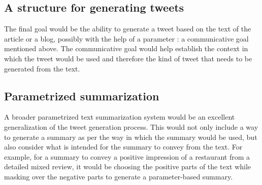 \subsection{A structure for generating tweets}
The final goal would be the ability to generate a tweet based on the text of the article or a blog, possibly with the help of a parameter : a communicative goal mentioned above. The communicative goal would help establish the context in which the tweet would be used and therefore the kind of tweet that needs to be generated from the text.  

\subsection{Parametrized summarization}
A broader parametrized text summarization system would be an excellent generalization of the tweet generation process. This would not only include a way to generate a summary as per the way in which the summary would be used, but also consider what is intended for the summary to convey from the text. For example, for a summary to convey a positive impression of a restaurant from a detailed mixed review, it would be choosing the positive parts of the text while masking over the negative parts to generate a parameter-based summary.